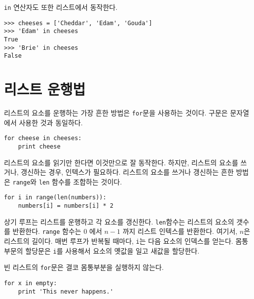 


{\tt in} 연산자도 또한 리스트에서 동작한다.

\beforeverb
\begin{verbatim}
>>> cheeses = ['Cheddar', 'Edam', 'Gouda']
>>> 'Edam' in cheeses
True
>>> 'Brie' in cheeses
False
\end{verbatim}
\afterverb


\section{리스트 운행법}

리스트의 요소를 운행하는 가장 흔한 방법은 {\tt for}문을 사용하는 것이다.
구문은 문자열에서 사용한 것과 동일하다.

\beforeverb
\begin{verbatim}
for cheese in cheeses:
    print cheese
\end{verbatim}
\afterverb
%

리스트의 요소를 읽기만 한다면 이것만으로 잘 동작한다. 하지만, 리스트의 요소를 쓰거나, 갱신하는 경우,
인텍스가 필요하다. 리스트의 요소를 쓰거나 갱신하는 흔한 방법은 {\tt range}와 {\tt len} 함수를 조합하는 것이다.


\beforeverb
\begin{verbatim}
for i in range(len(numbers)):
    numbers[i] = numbers[i] * 2
\end{verbatim}
\afterverb
%

상기 루프는 리스트를 운행하고 각 요소를 갱신한다. {\tt len}함수는 리스트의 요소의 갯수를 반환한다.
{\tt range} 함수는 0 에서 $n-1$ 까지 리스트 인텍스를 반환한다. 여기서, $n$은 리스트의 길이다.
매번 루프가 반복될 때마다, {\tt i}는 다음 요소의 인덱스를 얻는다. 몸통 부문의 할당문은 {\tt i}를 사용해서 요소의 옛값을 일고 새값을 할당한다.


빈 리스트의 {\tt for}문은 결코 몸통부분을 실행하지 않는다.

\beforeverb
\begin{verbatim}
for x in empty:
    print 'This never happens.'
\end{verbatim}
\afterverb
%

